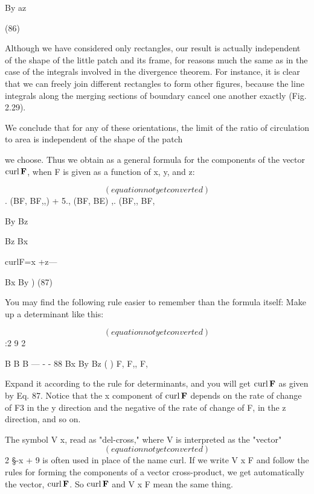 {By az

(86)

Although we have considered only rectangles, our result is actually
independent of the shape of the little patch and its frame, for reasons
much the same as in the case of the integrals involved in the divergence
theorem. For instance, it is clear that we can freely join different
rectangles to form other figures, because the line integrals
along the merging sections of boundary cancel one another exactly
(Fig. 2.29).

We conclude that for any of these orientations, the limit of the
ratio of circulation to area is independent of the shape of the patch

 

we choose. Thus we obtain as a general formula for the components
of the vector $\operatorname{curl}\mathbf{F}$, when F is given as a function of x, y, and z:

\begin{equation}
(equation not yet converted)
\end{equation}
. (BF, BF,,) + 5., (BF, BE) ,. (BF,, BF,

By Bz

Bz Bx

curlF=x +z---

Bx By ) (87)

You may find the following rule easier to remember than the formula
itself: Make up a determinant like this:

\begin{equation}
(equation not yet converted)
\end{equation}
:2 9 2

B B B
--- - - 88
Bx By Bz ( )
F, F,, F,

Expand it according to the rule for determinants, and you will get
$\operatorname{curl}\mathbf{F}$ as given by Eq. 87. Notice that the x component of $\operatorname{curl}\mathbf{F}$
depends on the rate of change of F3 in the y direction and the negative
of the rate of change of F, in the z direction, and so on.

The symbol V x, read as "del-cross," where V is interpreted as the
"vector"
\begin{equation}
(equation not yet converted)
\end{equation}
2 §-x + 9%
is often used in place of the name curl. If we write V x F and follow
the rules for forming the components of a vector cross-product, we
get automatically the vector, $\operatorname{curl}\mathbf{F}$. So $\operatorname{curl}\mathbf{F}$ and V x F mean the
same thing.

}
